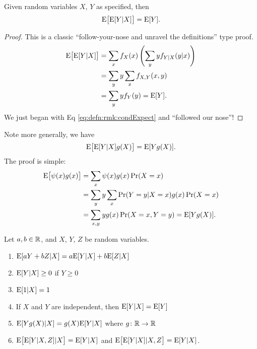 \begin{thm}
Given random variables $X$, $Y$ as specified, then
\begin{equation}
\mathrm{E}\bigl[\mathrm{E}[Y|X]\bigr] = \mathrm{E}[Y].
\end{equation}
\end{thm}
\begin{proof}
This is a classic ``follow-your-nose and unravel the definitions'' type proof.
\begin{subequations}
\begin{align}
\mathrm{E}\bigl[\mathrm{E}[Y|X]\bigr]
&=\sum_{x}f_{X}(x)\left(\sum_{y}yf_{Y|X}(y|x)\right)\\
&=\sum_{y}y\sum_{x}f_{X,Y}(x,y)\\
&=\sum_{y}yf_{Y}(y)=\mathrm{E}[Y].
\end{align}
\end{subequations}
We just began with Eq \eqref{eq:defn:rmk:condExpect} and ``followed our nose''!
\end{proof}

Note more generally, we have
\begin{equation}
\mathrm{E}\bigl[\mathrm{E}[Y|X]g(X)\bigr]=\mathrm{E}[Yg(X)].
\end{equation}
The proof is simple:
\begin{subequations}
\begin{align}
\mathrm{E}\bigl[\psi(x)g(x)\bigr]
&=\sum_{x}\psi(x)g(x)\mathop{\mathrm{Pr}}\nolimits(X=x)\\
&=\sum_{y}y\sum_{x}\mathop{\mathrm{Pr}}\nolimits(Y=y|X=x)g(x)\mathop{\mathrm{Pr}}\nolimits(X=x)\\
&=\sum_{x,y} yg(x)\mathop{\mathrm{Pr}}\nolimits(X=x,Y=y)=\mathrm{E}[Yg(X)].
\end{align}
\end{subequations}
\begin{thm}
Let $a,b\in\mathbb{R}$, and $X$, $Y$, $Z$ be random variables.
\begin{enumerate}
\item $\mathrm{E}[aY+bZ|X]=a\mathrm{E}[Y|X]+b\mathrm{E}[Z|X]$
\item $\mathrm{E}[Y|X]\geq0$ if $Y\geq0$
\item $\mathrm{E}[1|X]=1$
\item If $X$ and $Y$ are independent, then $\mathrm{E}[Y|X]=\mathrm{E}[Y]$
\item $\mathrm{E}[Yg(X)|X]=g(X)\mathrm{E}[Y|X]$ where $g\colon\mathbb{R}\to\mathbb{R}$
\item $\mathrm{E}\bigl[\mathrm{E}[Y|X,Z]|X\bigr]=\mathrm{E}[Y|X]$ and $\mathrm{E}\bigl[\mathrm{E}[Y|X]|X,Z\bigr]=\mathrm{E}[Y|X]$.
\end{enumerate}
\end{thm}
